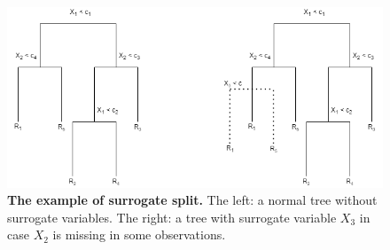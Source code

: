 \begin{figure}[ht]
\begin{center}
\includegraphics[scale=0.5]{./images/surrogate_split_example}
\caption{{\bf The example of surrogate split.} The left: a normal tree without surrogate variables. The right: a tree with surrogate variable $X_3$ in case $X_2$ is missing in some observations.\setlength{\baselineskip}{1.25em}}
\label{fig_surrogate_split_example}
\end{center}
\end{figure}